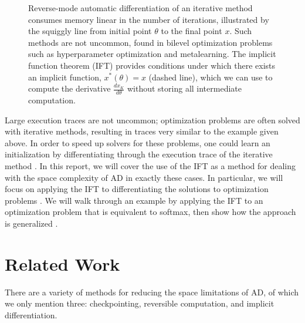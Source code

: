 \documentclass[11pt]{article}
\begin{document}
\begin{figure}
\centering
{}
\caption{
\label{fig:optift}
Reverse-mode automatic differentiation of an iterative method consumes memory
linear in the number of iterations,
illustrated by the squiggly line from initial point $\theta$ to the final point $x$.
Such methods are not uncommon, found in bilevel optimization problems such as
hyperparameter optimization and metalearning.
The implicit function theorem (IFT)
provides conditions under which there exists an implicit function,
$x^*(\theta) = x$ (dashed line), which we can use to compute the derivative
$\frac{dx_K}{d\theta}$ without storing all intermediate computation.
}
\end{figure}


Large execution traces are not uncommon;
optimization problems are often solved with iterative methods,
resulting in traces very similar to the example given above.
In order to speed up solvers for these problems,
one could learn an initialization by differentiating through the
execution trace of the iterative method \citep{finn2017maml,kim2018savi,neuralinit}.
In this report, we will cover the use of the IFT
as a method for dealing with the space complexity of AD in exactly these cases.
In particular,
we will focus on applying the IFT to differentiating the solutions to optimization problems
\citep{optnet,agrawal2019diffcvx}.
We will walk through an example by applying the IFT to an optimization problem
that is equivalent to softmax,
then show how the approach is generalized \citep{optnet}.

\section{Related Work}
There are a variety of methods for reducing the space limitations of AD,
of which we only mention three: checkpointing, reversible computation, and implicit differentiation.
\end{document}
